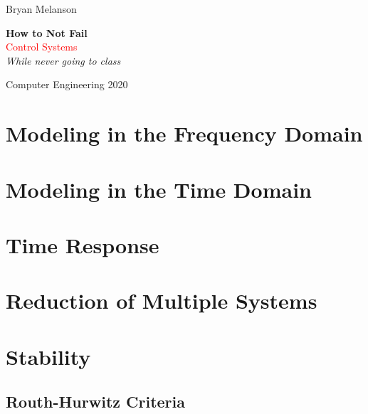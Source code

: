 \documentclass[11pt]{article}
\newcommand*{\plogo}{\fbox{$\mathcal{BM}$}}
\begin{document}
 
        
    \begin{titlepage}
    
        \raggedleft
        
        \vspace*{\baselineskip}
        
        {\Large Bryan Melanson}
        
        \vspace*{0.167\textheight}
        
        \textbf{\LARGE How to Not Fail}\\[\baselineskip]
        
        {\textcolor{Red}{\Huge Control Systems}}\\[\baselineskip]
        
        {\Large \textit{While never going to class}}
        
        \vfill
        
        {\large Computer Engineering 2020 ~~\plogo}
        
        \vspace*{3\baselineskip}
    
    \end{titlepage}

    \pagebreak

    \tableofcontents

    \pagebreak

    \section{Modeling in the Frequency Domain}

    \section{Modeling in the Time Domain}
    \section{Time Response}
    \section{Reduction of Multiple Systems}
    \section{Stability}
    \subsection{Routh-Hurwitz Criteria}
\end{document}
